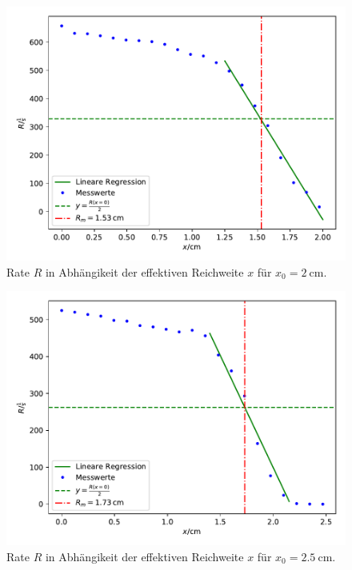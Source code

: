 \begin{figure}[h!]
  \centering
  \includegraphics[scale=0.6]{Messung1a.pdf}
  \caption{Rate $R$ in Abhängikeit der effektiven Reichweite $x$ für $x_0=\SI{2}{\centi\meter}$.}
  \label{abb:2}
\end{figure}
\begin{figure}[h!]
  \centering
  \includegraphics[scale=0.6]{Messung2a.pdf}
  \caption{Rate $R$ in Abhängikeit der effektiven Reichweite $x$ für $x_0=\SI{2,5}{\centi\meter}$.}
  \label{abb:3}
\end{figure}
